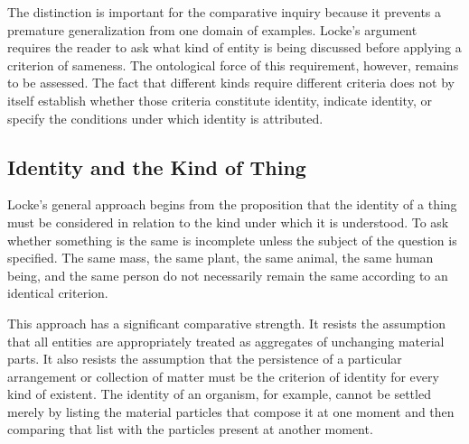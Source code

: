 \label{para:VS.B01.P01.C08.S08.SS02.P003}

The distinction is important for the comparative inquiry
because it prevents a premature generalization from one
domain of examples. Locke's argument requires the reader
to ask what kind of entity is being discussed before
applying a criterion of sameness. The ontological force
of this requirement, however, remains to be assessed.
The fact that different kinds require different criteria
does not by itself establish whether those criteria
constitute identity, indicate identity, or specify the
conditions under which identity is attributed.



\subsection{Identity and the Kind of Thing}
\label{subsec:ch08-locke-kinds}

\label{para:VS.B01.P01.C08.S08.SS03.P001}

Locke's general approach begins from the proposition
that the identity of a thing must be considered in
relation to the kind under which it is understood.
To ask whether something is the same is incomplete
unless the subject of the question is specified.
The same mass, the same plant, the same animal, the
same human being, and the same person do not necessarily
remain the same according to an identical criterion.
\cite[II.xxvii.1--8]{LockeEssay}

\label{para:VS.B01.P01.C08.S08.SS03.P002}

This approach has a significant comparative strength.
It resists the assumption that all entities are
appropriately treated as aggregates of unchanging
material parts. It also resists the assumption that
the persistence of a particular arrangement or
collection of matter must be the criterion of identity
for every kind of existent. The identity of an organism,
for example, cannot be settled merely by listing the
material particles that compose it at one moment and
then comparing that list with the particles present
at another moment.

